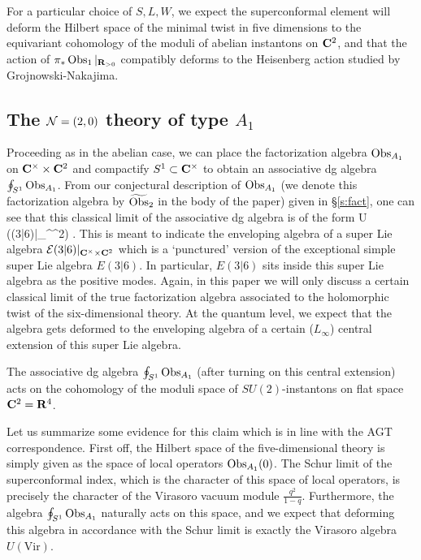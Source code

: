 For a particular choice of $S,L,W$, we expect the superconformal element will deform the Hilbert space of the minimal twist in five dimensions to the equivariant cohomology of the moduli of abelian instantons on $\mathbf{C}^{2}$, and that the action of $\pi_{*}\operatorname{Obs}_{1}|_{\mathbf{R}_{>0}}$ compatibly deforms to the Heisenberg action studied by Grojnowski-Nakajima.

\subsection*{The $\mathcal N=(2,0)$ theory of type $A_1$} 


Proceeding as in the abelian case, we can place the factorization algebra $\operatorname{Obs}_{A_1}$ on $\mathbf{C}^\times \times \mathbf{C}^2$ and compactify $S^1 \subset \mathbf{C}^\times$ to obtain an associative dg algebra $\oint_{S^1} \operatorname{Obs}_{A_1}$.
From our conjectural description of $\operatorname{Obs}_{A_1}$ (we denote this factorization algebra by $\widetilde{\operatorname{Obs}}_2$ in the body of the paper) given in \S \ref{s:fact}, one can see that this classical limit of the associative dg algebra is of the form
\beqn
U \left(\cE(3|6)|_{\C^\times \times \C^2}\right) .
\eeqn
This is meant to indicate the enveloping algebra of a super Lie algebra $\mathcal E(3|6)|_{\mathbf{C}^\times \times \mathbf{C}^2}$ which is a `punctured' version of the exceptional simple super Lie algebra $E(3|6)$. 
In particular, $E(3|6)$ sits inside this super Lie algebra as the positive modes.
Again, in this paper we will only discuss a certain classical limit of the true factorization algebra associated to the holomorphic twist of the six-dimensional theory. 
At the quantum level, we expect that the algebra gets deformed to the enveloping algebra of a certain ($L_\infty$) central extension of this super Lie algebra.

\begin{conj}
The associative dg algebra $\oint_{S^1} \operatorname{Obs}_{A_1}$ (after turning on this central extension) acts on the cohomology of the moduli space of $SU(2)$-instantons on flat space~$\mathbf{C}^2 = \mathbf{R}^4$. 
\end{conj}

Let us summarize some evidence for this claim which is in line with the AGT correspondence. 
First off, the Hilbert space of the five-dimensional theory is simply given as the space of local operators $\operatorname{Obs}_{A_1}(0)$.
The Schur limit of the superconformal index, which is the character of this space of local operators, is precisely the character of the Virasoro vacuum module $\frac{q^2}{1-q}$.
Furthermore, the algebra $\oint_{S^1} \operatorname{Obs}_{A_1}$ naturally acts on this space, and we expect that deforming this algebra in accordance with the Schur limit is exactly the Virasoro algebra $U(\text{Vir})$.


%
